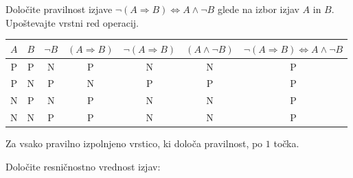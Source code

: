 \documentclass[addpoints]{exam}
\begin{document}
\begin{questions}

    
    \question[4]
    Določite pravilnost izjave $\lnot( A\Rightarrow  B)\Leftrightarrow A\land \lnot B$ glede na izbor izjav $A$ in $B$. Upoštevajte vrstni red operacij.

    \begin{solution}[9cm]
        \begin{table}[H]
            \begin{tabular}{ccccccc}
             $A$ & $B$ & $\lnot B$ & $(A\Rightarrow B)$ & $\lnot(A\Rightarrow B)$ & $(A\land \lnot B)$ & $\lnot( A\Rightarrow  B)\Leftrightarrow A\land \lnot B$\\ \hline
             P & P & N & P & N & N & P \\ 
             P & N & P & N & P & P & P \\
             N & P & N & P & N & N & P \\
             N & N & P & P & N & N & P
            \end{tabular}
        \end{table}
        Za vsako pravilno izpolnjeno vrstico, ki določa pravilnost, po $1$ točka.

    \end{solution}




    \question[3]
    Določite resničnostno vrednost izjav:


\end{questions}
\end{document}
